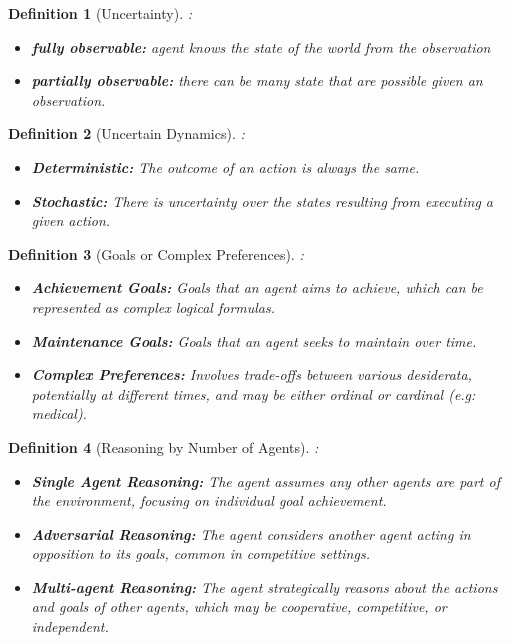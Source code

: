 \documentclass{article}
\theoremstyle{note}
\newtheorem{definition}{Definition}[section]
\begin{document}
\begin{definition}[Uncertainty]:
\begin{itemize}
    \item \textbf{fully observable:} agent knows the state of the world from the observation
    \item \textbf{partially observable:} there can be many state that are possible given an observation.
\end{itemize}
\end{definition}

\begin{definition}[Uncertain Dynamics]:
\begin{itemize}
    \item \textbf{Deterministic:} The outcome of an action is always the same.
    \item \textbf{Stochastic:} There is uncertainty over the states resulting from executing a given action.
\end{itemize}
\end{definition}

\begin{definition}[Goals or Complex Preferences]:
\begin{itemize}
    \item \textbf{Achievement Goals:} Goals that an agent aims to achieve, which can be represented as complex logical formulas.
    \item \textbf{Maintenance Goals:} Goals that an agent seeks to maintain over time.
    \item \textbf{Complex Preferences:} Involves trade-offs between various desiderata, potentially at different times, and may be either ordinal or cardinal (e.g: medical).
\end{itemize}
\end{definition}

\begin{definition}[Reasoning by Number of Agents]:
\begin{itemize}
    \item \textbf{Single Agent Reasoning:} The agent assumes any other agents are part of the environment, focusing on individual goal achievement.
    \item \textbf{Adversarial Reasoning:} The agent considers another agent acting in opposition to its goals, common in competitive settings.
    \item \textbf{Multi-agent Reasoning:} The agent strategically reasons about the actions and goals of other agents, which may be cooperative, competitive, or independent.
\end{itemize}
\end{definition}
\end{document}
